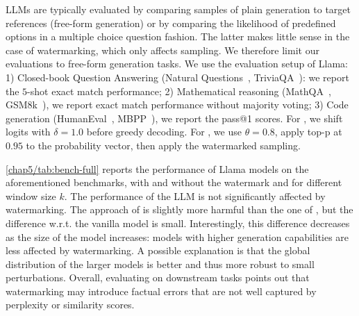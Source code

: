 LLMs are typically evaluated by comparing samples of plain generation to target references (free-form generation) or by comparing the likelihood of predefined options in a multiple choice question fashion. 
The latter makes little sense in the case of watermarking, which only affects sampling.
We therefore limit our evaluations to free-form generation tasks.
We use the evaluation setup of Llama:
1) Closed-book Question Answering (Natural Questions~\citep{kwiatkowski2019natural}, TriviaQA~\citep{joshi2017triviaqa}): we report the $5$-shot exact match performance;
2) Mathematical reasoning (MathQA~\citep{hendrycks2021measuring}, GSM8k~\citep{cobbe2021training}), we report exact match performance without majority voting;
3) Code generation (HumanEval~\citep{chen2021Evaluating}, MBPP~\citep{austin2021program}), we report the pass@1 scores.
For \citep{kirchenbauer2023watermark}, we shift logits with $\delta=1.0$ before greedy decoding.
For \citep{aaronson2023watermarking}, we use $\theta = 0.8$, apply top-p at $0.95$ to the probability vector, then apply the watermarked sampling.

\autoref{chap5/tab:bench-full} reports the performance of Llama models on the aforementioned benchmarks, with and without the watermark and for different window size $k$. 
The performance of the LLM is not significantly affected by watermarking. 
The approach of \cite{kirchenbauer2023watermark} is slightly more harmful than the one of \cite{aaronson2023watermarking}, but the difference w.r.t. the vanilla model is small.
Interestingly, this difference decreases as the size of the model increases: models with higher generation capabilities are less affected by watermarking. A possible explanation is that the global distribution of the larger models is better and thus more robust to small perturbations.
Overall, evaluating on downstream tasks points out that watermarking may introduce factual errors that are not well captured by perplexity or similarity scores.












